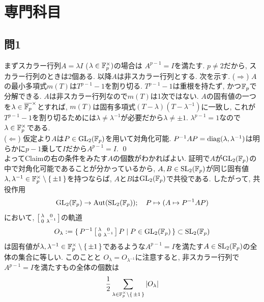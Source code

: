 \section{専門科目}
\subsection{問1}
まずスカラー行列$A = \lambda I$ ($\lambda\in \mathbb{F}_{p}^{\times})$の場合は
$A^{p-1} = I$を満たす. $p\neq 2$だから, スカラー行列のときは2個ある. 以降$A$は非スカラー行列とする. 次を示す.
\prf
($\Rightarrow$) $A$の最小多項式$m(T)$は$T^{p-1}-1$を割り切る. $T^{p-1}-1$は重根を持たず, かつ$\mathbb{F}_{p}$で分解できる. $A$は非スカラー行列なので$m(T)$は1次ではない. $A$の固有値の一つを$\lambda\in \overline{\mathbb{F}_{p}}^{\times}$とすれば,  $m(T)$は固有多項式$(T-\lambda)(T-\lambda^{-1})$に一致し, これが$T^{p-1}-1$を割り切るためには$\lambda\neq \lambda^{-1}$が必要だから$\lambda\neq \pm 1$.  $\lambda^{p-1}=1$なので$\lambda\in \mathbb{F}_{p}^{\times}$である. \\
($\Leftarrow$) 仮定より$A$は$P\in \mathrm{GL}_{2}(\mathbb{F}_{p})$を用いて対角化可能. $P^{-1}AP= \mathrm{diag}(\lambda, \lambda^{-1})$は明らかに$p-1$乗して$I$だから$A^{p-1}=I$. \qed \\
よってClaimの右の条件をみたす$A$の個数がわかればよい. 証明で$A$が$\mathrm{GL}_{2}(\mathbb{F}_{p})$の中で対角化可能であることが分かっているから, $A,B\in \mathrm{SL}_{2}(\mathbb{F}_{p})$が同じ固有値$\lambda,\lambda^{-1}\in \mathbb{F}_{p}^{\times} \setminus{\set{\pm 1}}$を持つならば, $A$と$B$は$\mathrm{GL}_{2}(\mathbb{F}_{p})$で共役である. したがって, 共役作用
\[\mathrm{GL}_{2}(\mathbb{F}_{p})\to \mathrm{Aut}(\mathrm{SL}_{2}(\mathbb{F}_{p})); \quad P\mapsto (A\mapsto P^{-1}AP)\]
において, $\left[\begin{smallmatrix}\lambda & 0 \\ 0 & \lambda^{-1}\end{smallmatrix}\right]$の軌道
\[O_{\lambda} := \set{P^{-1}\left[\begin{smallmatrix}\lambda & 0 \\ 0 & \lambda^{-1}\end{smallmatrix}\right] P \mid  P \in \mathrm{GL}_{2}(\mathbb{F}_{p}) } \subset \mathrm{SL}_{2}(\mathbb{F}_{p})\]
は固有値が$\lambda, \lambda^{-1}\in \mathbb{F}_{p}^{\times}\setminus{\set{\pm 1}}$であるような$A^{p-1} = I$を満たす$A\in \mathrm{SL}_{2}(\mathbb{F}_{p})$の全体の集合に等しい. このことと $O_{\lambda} = O_{\lambda^{-1}}$に注意すると, 非スカラー行列で$A^{p-1} = I$を満たすもの全体の個数は
\[\dfrac{1}{2} \sum_{\lambda \in \mathbb{F}_{p}^{\times}\setminus{\set{\pm 1}}}|O_{\lambda}| \]
